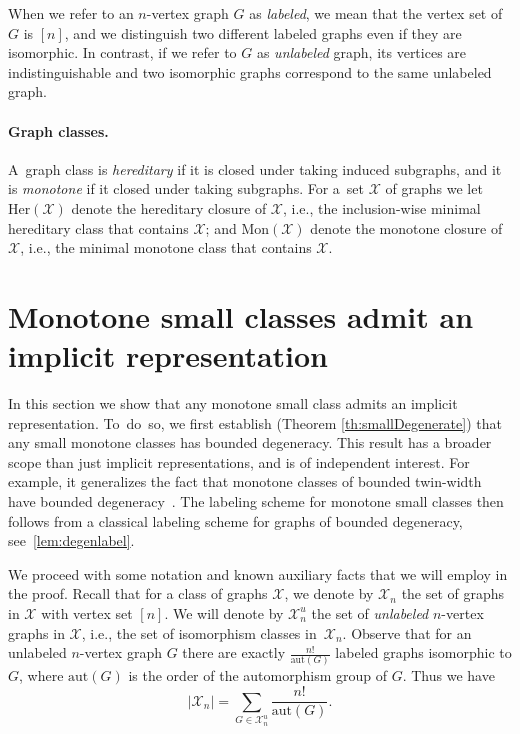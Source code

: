 \documentclass[letterpaper,11pt]{article}
\newcommand{\Xc}{\mathcal{X}}
\theoremstyle{definition}
\theoremstyle{remark}
\newcommand{\her}{\mathrm{Her}}
\newcommand{\mon}{\mathrm{Mon}}
\newcommand{\aut}{\mathrm{aut}}
\begin{document}
        When we refer to an $n$-vertex graph $G$ as \emph{labeled}, we mean that the vertex set of $G$
        is $[n]$, and we distinguish two different labeled graphs even if they are isomorphic.
        In contrast, if we refer to $G$ as \emph{unlabeled} graph, its vertices are indistinguishable and
        two isomorphic graphs correspond to the same unlabeled graph. 


	\paragraph{Graph classes.} A~graph class is \emph{hereditary} if it is closed under taking induced subgraphs, and it is \emph{monotone} if it closed under taking subgraphs.
	For a~set $\Xc$ of graphs we let $\her(\Xc)$ denote the hereditary closure of $\Xc$, i.e., the inclusion-wise minimal hereditary class that contains $\Xc$; and $\mon(\Xc)$ denote the monotone closure of $\Xc$, i.e., the minimal monotone class that contains $\Xc$. 


	

		
	\section{Monotone small classes admit an implicit representation}
	\label{sec:phase-transition}
	
	In this section we show that any monotone small class admits an implicit representation. 
	To~do~so, we first establish (Theorem \ref{th:smallDegenerate}) that any small monotone classes has bounded degeneracy.
        This result has a broader scope than just implicit representations, and is of independent interest.
        For example, it generalizes the fact that monotone classes of bounded twin-width have bounded degeneracy~\cite[$(iv) \Rightarrow (iii)$ in Theorem 2.12]{BGK22}.
	The labeling scheme for monotone small classes then follows from a classical labeling scheme for graphs of bounded degeneracy, see~\cref{lem:degenlabel}. 
	
	We proceed with some notation and known auxiliary facts that we will employ in the proof. 
	Recall that for a class of graphs $\Xc$, we denote by $\Xc_n$ the set of graphs in $\Xc$ with vertex set $[n]$.
        We will denote by $\Xc_n^u$ the set of \emph{unlabeled} $n$-vertex graphs in $\Xc$, i.e., the set of isomorphism classes in~$\Xc_n$. 
	Observe that for an unlabeled $n$-vertex graph $G$ there are exactly $\frac{n!}{\aut(G)}$ labeled graphs isomorphic to $G$, where $\aut(G)$ is the order of the automorphism group of $G$.
        Thus we have
	\[
	|\Xc_n| = \sum_{G \in \Xc_n^u} \frac{n!}{\aut(G)}.
	\]
	
\end{document}
